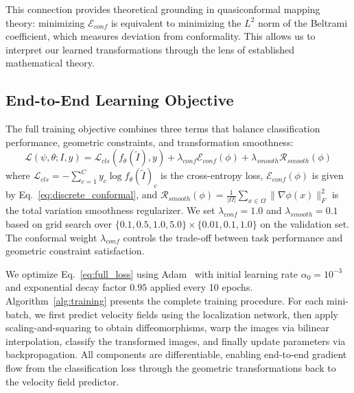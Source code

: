 This connection provides theoretical grounding in quasiconformal mapping theory: minimizing $\mathcal{E}_{conf}$ is equivalent to minimizing the $L^2$ norm of the Beltrami coefficient, which measures deviation from conformality. This allows us to interpret our learned transformations through the lens of established mathematical theory.

\subsection{End-to-End Learning Objective}
\label{subsec:objective}

The full training objective combines three terms that balance classification performance, geometric constraints, and transformation smoothness:
\begin{equation}
\mathcal{L}(\psi, \theta; I, y) = \mathcal{L}_{cls}(f_\theta(\tilde{I}), y) + \lambda_{conf} \mathcal{E}_{conf}(\phi) + \lambda_{smooth} \mathcal{R}_{smooth}(\phi)
\label{eq:full_loss}
\end{equation}
where $\mathcal{L}_{cls} = -\sum_{c=1}^C y_c \log f_\theta(\tilde{I})_c$ is the cross-entropy loss, $\mathcal{E}_{conf}(\phi)$ is given by Eq.~\eqref{eq:discrete_conformal}, and $\mathcal{R}_{smooth}(\phi) = \frac{1}{|\Omega|} \sum_{x \in \Omega} \|\nabla \phi(x)\|_F^2$ is the total variation smoothness regularizer. We set $\lambda_{conf} = 1.0$ and $\lambda_{smooth} = 0.1$ based on grid search over $\{0.1, 0.5, 1.0, 5.0\} \times \{0.01, 0.1, 1.0\}$ on the validation set. The conformal weight $\lambda_{conf}$ controls the trade-off between task performance and geometric constraint satisfaction.

We optimize Eq.~\eqref{eq:full_loss} using Adam~\cite{kingma2014adam} with initial learning rate $\alpha_0 = 10^{-3}$ and exponential decay factor $0.95$ applied every 10 epochs. Algorithm~\ref{alg:training} presents the complete training procedure. For each mini-batch, we first predict velocity fields using the localization network, then apply scaling-and-squaring to obtain diffeomorphisms, warp the images via bilinear interpolation, classify the transformed images, and finally update parameters via backpropagation. All components are differentiable, enabling end-to-end gradient flow from the classification loss through the geometric transformations back to the velocity field predictor.

